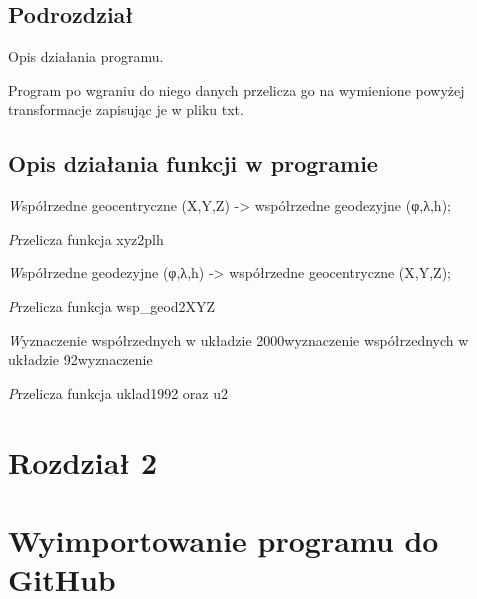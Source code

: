 \documentclass[10pt,a4paper]{article}
\begin{document}
\subsection{Podrozdział}
Opis działania programu.

Program po wgraniu do niego danych przelicza go na wymienione powyżej transformacje zapisując je w pliku txt. 

\subsection{Opis działania funkcji w programie }
\item \emph Współrzedne geocentryczne (X,Y,Z) -> współrzedne geodezyjne (φ,λ,h);
\item \emph Przelicza funkcja  xyz2plh
\item \emph Współrzedne geodezyjne (φ,λ,h) -> współrzedne geocentryczne (X,Y,Z);
\item \emph Przelicza funkcja wsp_geod2XYZ
\item \emph Wyznaczenie współrzednych w układzie 2000wyznaczenie współrzednych w układzie 92wyznaczenie
\item \emph Przelicza funkcja uklad1992 oraz u2
\newpage 
\section{Rozdział 2}
\section{Wyimportowanie programu do GitHub}
\end{document}
